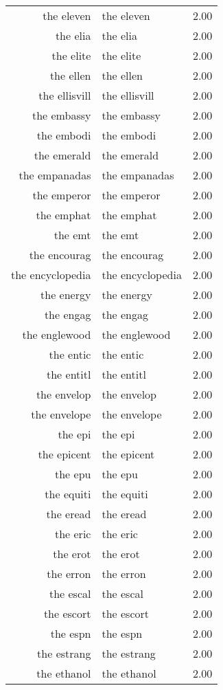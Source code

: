 \begin{table}[ht]
\begin{tabular}{rlr}
  the eleven & the eleven & 2.00 \\ 
  the elia & the elia & 2.00 \\ 
  the elite & the elite & 2.00 \\ 
  the ellen & the ellen & 2.00 \\ 
  the ellisvill & the ellisvill & 2.00 \\ 
  the embassy & the embassy & 2.00 \\ 
  the embodi & the embodi & 2.00 \\ 
  the emerald & the emerald & 2.00 \\ 
  the empanadas & the empanadas & 2.00 \\ 
  the emperor & the emperor & 2.00 \\ 
  the emphat & the emphat & 2.00 \\ 
  the emt & the emt & 2.00 \\ 
  the encourag & the encourag & 2.00 \\ 
  the encyclopedia & the encyclopedia & 2.00 \\ 
  the energy & the energy & 2.00 \\ 
  the engag & the engag & 2.00 \\ 
  the englewood & the englewood & 2.00 \\ 
  the entic & the entic & 2.00 \\ 
  the entitl & the entitl & 2.00 \\ 
  the envelop & the envelop & 2.00 \\ 
  the envelope & the envelope & 2.00 \\ 
  the epi & the epi & 2.00 \\ 
  the epicent & the epicent & 2.00 \\ 
  the epu & the epu & 2.00 \\ 
  the equiti & the equiti & 2.00 \\ 
  the eread & the eread & 2.00 \\ 
  the eric & the eric & 2.00 \\ 
  the erot & the erot & 2.00 \\ 
  the erron & the erron & 2.00 \\ 
  the escal & the escal & 2.00 \\ 
  the escort & the escort & 2.00 \\ 
  the espn & the espn & 2.00 \\ 
  the estrang & the estrang & 2.00 \\ 
  the ethanol & the ethanol & 2.00 \\ 

\end{tabular}
\end{table}
